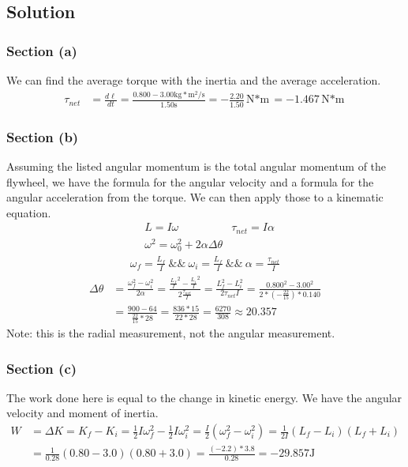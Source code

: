 \documentclass[12pt]{article}
\begin{document}
\subsection{Solution}
\subsubsection{Section (a)}
We can find the average torque with the inertia and the average acceleration.
\begin{align}
    \tau_{net}  &=  \frac{d\ell}{dt}
        =   \frac{0.800 - 3.00 \unit{\kilo\gram*\meter^2/\second}}{1.50 \unit{\second}}
        =   -\frac{2.20}{1.50}\unit{\newton*\meter}
        =   \boxed{-1.467\unit{\newton*\meter}}
\end{align}

\subsubsection{Section (b)}
Assuming the listed angular momentum is the total angular momentum of the flywheel, we have the formula for the angular velocity and a formula for the angular acceleration from the torque. We can then apply those to a kinematic equation.
\begin{align}
    &L = I\omega    &\tau_{net} = I\alpha\\
    &\omega^2 = \omega_0^2 + 2\alpha\Delta \theta
\end{align}
\begin{gather}
    \omega_f    =   \frac{L_f}{I}\ \&\&\ 
    \omega_i    =   \frac{L_f}{I}\ \&\&\ 
    \alpha  =   \frac{\tau_{net}}{I}
\end{gather}
\begin{align}
    \Delta\theta    &=  \frac{\omega_f^2 - \omega_i^2}{2\alpha}
        =   \frac{\frac{L_f}{I}^2 - \frac{L_i}{I}^2}{2\frac{\tau_{net}}{I}}
        =   \frac{L_f^2 - L_i^2}{2\tau_{net}I}
        =   \frac{0.800^2 - 3.00^2}{2*(-\frac{22}{15})*0.140}\\
        &=  \frac{900 - 64}{\frac{22}{15}*28}
        =   \frac{836*15}{22*28}
        =   \frac{6270}{308}
        \approx \boxed{20.357}
\end{align}
Note: this is the radial measurement, not the angular measurement.

\subsubsection{Section (c)}
The work done here is equal to the change in kinetic energy. We have the angular velocity and moment of inertia. 
\begin{align}
    W   &=  \Delta K
        =   K_f - K_i
        =   \frac{1}{2}I\omega_f^2 - \frac{1}{2}I\omega_i^2
        =   \frac{I}{2}(\omega_f^2 - \omega_i^2)
        =   \frac{1}{2I}(L_f - L_i)(L_f + L_i)\\
        &=  \frac{1}{0.28}(0.80 - 3.0)(0.80 + 3.0)
        =   \frac{(-2.2)*3.8}{0.28}
        =   \boxed{-29.857\unit{\joule}}
\end{align}
\end{document}
